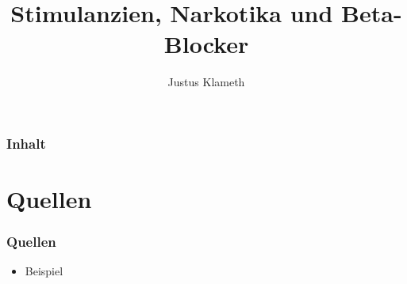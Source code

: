 \documentclass[compress]{beamer}
\title{Stimulanzien, Narkotika und Beta-Blocker}
\author{Justus Klameth}
\institute{Joseph-König-Gymnasium}
\begin{document}
    \frame{\titlepage}

    \begin{frame}
        \frametitle{Inhalt}
        \tableofcontents
    \end{frame}

    \section{Quellen}

    \begin{frame}
        \frametitle{Quellen}
        
        \begin{itemize}
            \item Beispiel
        \end{itemize}

    \end{frame}
\end{document}
